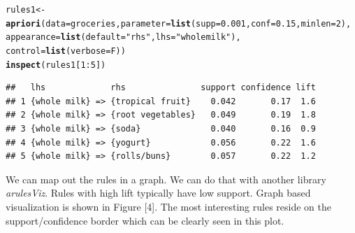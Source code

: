 \documentclass{article}\usepackage[]{graphicx}\usepackage[]{color}
\makeatletter
\newcommand{\hlnum}[1]{\textcolor[rgb]{0.686,0.059,0.569}{#1}}%
\newcommand{\hlstr}[1]{\textcolor[rgb]{0.192,0.494,0.8}{#1}}%
\newcommand{\hlopt}[1]{\textcolor[rgb]{0,0,0}{#1}}%
\newcommand{\hlstd}[1]{\textcolor[rgb]{0.345,0.345,0.345}{#1}}%
\newcommand{\hlkwb}[1]{\textcolor[rgb]{0.69,0.353,0.396}{#1}}%
\newcommand{\hlkwc}[1]{\textcolor[rgb]{0.333,0.667,0.333}{#1}}%
\newcommand{\hlkwd}[1]{\textcolor[rgb]{0.737,0.353,0.396}{\textbf{#1}}}%
\newenvironment{kframe}{%
 \def\at@end@of@kframe{}%
 \ifinner\ifhmode%
  \def\at@end@of@kframe{\end{minipage}}%
  \begin{minipage}{\columnwidth}%
 \fi\fi%
 \def\FrameCommand##1{\hskip\@totalleftmargin \hskip-\fboxsep
 \colorbox{shadecolor}{##1}\hskip-\fboxsep
     \hskip-\linewidth \hskip-\@totalleftmargin \hskip\columnwidth}%
 \MakeFramed {\advance\hsize-\width
   \@totalleftmargin\z@ \linewidth\hsize
   \@setminipage}}%
 {\par\unskip\endMakeFramed%
 \at@end@of@kframe}
\newenvironment{knitrout}{}{} %
\makeatother
\begin{document}
\begin{knitrout}
\color{fgcolor}\begin{kframe}
\begin{alltt}
\hlstd{rules1}\hlkwb{<-}\hlkwd{apriori}\hlstd{(}\hlkwc{data}\hlstd{=groceries,} \hlkwc{parameter}\hlstd{=}\hlkwd{list}\hlstd{(}\hlkwc{supp}\hlstd{=}\hlnum{0.001}\hlstd{,}\hlkwc{conf} \hlstd{=} \hlnum{0.15}\hlstd{,}\hlkwc{minlen}\hlstd{=}\hlnum{2}\hlstd{),}
               \hlkwc{appearance} \hlstd{=} \hlkwd{list}\hlstd{(}\hlkwc{default}\hlstd{=}\hlstr{"rhs"}\hlstd{,}\hlkwc{lhs}\hlstd{=}\hlstr{"whole milk"}\hlstd{),}
               \hlkwc{control} \hlstd{=} \hlkwd{list}\hlstd{(}\hlkwc{verbose}\hlstd{=F))}
\hlkwd{inspect}\hlstd{(rules1[}\hlnum{1}\hlopt{:}\hlnum{5}\hlstd{])}
\end{alltt}
\begin{verbatim}
##   lhs             rhs               support confidence lift
## 1 {whole milk} => {tropical fruit}    0.042       0.17  1.6
## 2 {whole milk} => {root vegetables}   0.049       0.19  1.8
## 3 {whole milk} => {soda}              0.040       0.16  0.9
## 4 {whole milk} => {yogurt}            0.056       0.22  1.6
## 5 {whole milk} => {rolls/buns}        0.057       0.22  1.2
\end{verbatim}
\end{kframe}
\end{knitrout}
We can map out the rules in a graph. We can do that with another library \textit{arulesViz}. Rules with high lift typically have low support. Graph based visualization is shown in Figure [4]. The most interesting rules reside on the support/confidence border which can be clearly seen in this plot.\par
\end{document}
